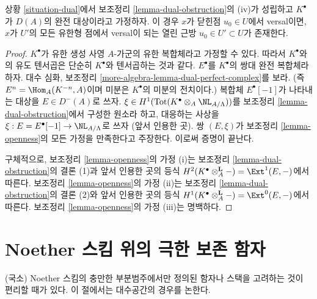 \begin{lemma}
\label{lemma-dual-openness}
상황 \ref{situation-dual}에서 보조정리 \ref{lemma-dual-obstruction}의
(iv)가 성립하고 $K^\bullet$가 $D(A)$의 완전 대상이라고 가정하자.
이 경우 $x$가 닫힌점 $u_0 \in U$에서 versal이면,
$x$가 $U'$의 모든 유한형 점에서 versal이 되는 열린 근방
$u_0 \in U' \subset U$가 존재한다.
\end{lemma}

\begin{proof}
$K^\bullet$가 유한 생성 사영 $A$-가군의 유한 복합체라고 가정할 수 있다.
따라서 $K^\bullet$와의 유도 텐서곱은 단순히 $K^\bullet$와 텐서곱하는
것과 같다. $E^\bullet$를 $K^\bullet$의 쌍대 완전 복합체라 하자.
대수 심화, 보조정리 \ref{more-algebra-lemma-dual-perfect-complex}를 보라.
(즉 $E^n = \Hom_A(K^{-n}, A)$이며 미분은 $K^\bullet$의 미분의 전치이다.)
복합체 $E^\bullet[-1]$가 나타내는 대상을 $E \in D^{-}(A)$로 쓰자.
$\xi \in H^1(\text{Tot}(K^\bullet \otimes_A \NL_{A/\Lambda}))$를
보조정리 \ref{lemma-dual-obstruction}에서 구성한 원소라 하고,
대응하는 사상을 $\xi : E = E^\bullet[-1] \to \NL_{A/\Lambda}$로 쓰자
(앞서 인용한 곳). 쌍 $(E, \xi)$가 보조정리 \ref{lemma-openness}의 모든
가정을 만족한다고 주장한다. 이로써 증명이 끝난다.

\medskip\noindent
구체적으로, 보조정리 \ref{lemma-openness}의 가정 (i)는
보조정리 \ref{lemma-dual-obstruction}의 결론 (1)과 앞서 인용한 곳의 등식
$H^2(K^\bullet \otimes_A^\mathbf{L} -) =
\Ext^1(E, -)$에서 따른다.
보조정리 \ref{lemma-openness}의 가정 (ii)는
보조정리 \ref{lemma-dual-obstruction}의 결론 (2)와 앞서 인용한 곳의 등식
$H^1(K^\bullet \otimes_A^\mathbf{L} -) =
\Ext^0(E, -)$에서 따른다. 보조정리 \ref{lemma-openness}의 가정 (iii)는 명백하다.
\end{proof}







\section{Noether 스킴 위의 극한 보존 함자}
\label{section-noetherian}

\noindent
(국소) Noether 스킴의 충만한 부분범주에서만 정의된 함자나 스택을
고려하는 것이 편리할 때가 있다. 이 절에서는 대수공간의 경우를 논한다.

